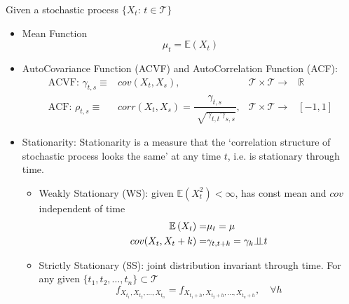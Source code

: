     Given a stochastic process $ \{X_t:\,t\in \mathcal{T}\} $

    \begin{itemize}[topsep=2pt,itemsep=0pt]
        \item Mean Function
        \begin{equation}
            \mu _t=\mathbb{E}\left( X_t \right)  
        \end{equation}        
        
        \item AutoCovariance Function (ACVF) and AutoCorrelation Function (ACF):
        \begin{align*}
            \text{ACVF: }\gamma _{t,s}\equiv &cov(X_t,X_s),& \mathcal{T}\times \mathcal{T}\to&\mathbb{R}\\
            \text{ACF: }\rho  _{t,s}\equiv &corr(X_t,X_s)=\dfrac{\gamma _{t,s}}{\sqrt[]{\gamma _{t,t}\gamma _{s,s}}},& \mathcal{T}\times \mathcal{T}\to& [-1,1]
        \end{align*}

        \item Stationarity: Stationarity is a measure that the `correlation structure of stochastic process looks the same' at any time $ t $, i.e. is stationary through time.
        \begin{itemize}[topsep=2pt,itemsep=0pt]
            \item Weakly Stationary (WS): given $ \mathbb{E}\left( X_t^2 \right) < \infty $, has const mean and $ cov  $ independent of time
            \begin{align*}
                \mathbb{E}\left( X_t \right) =&\mu _t=\mu \\
                cov(X_t,X_t+k)=&\gamma _{t,t+k}=\gamma _k\bot\!\!\!\bot t
            \end{align*}

            \item Strictly Stationary (SS): joint distribution invariant through time. For any given $ \{t_1,t_2,\ldots,t_n\}\subset \mathcal{T} $
            \begin{equation}
                f_{X_{t_1},X_{t_2},\ldots,X_{t_n}}=f_{X_{t_1+h},X_{t_2+h},\ldots,X_{t_n+h}},\quad \forall h 
            \end{equation}
            
        \end{itemize}


\end{itemize}
